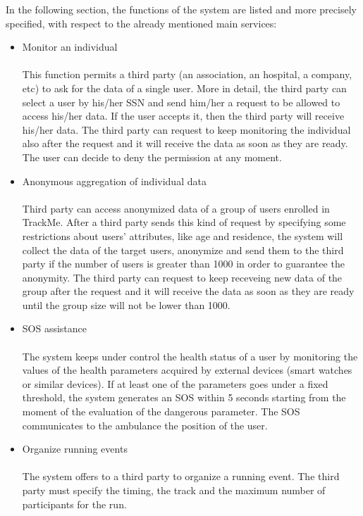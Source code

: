 \documentclass{article}
\begin{document}
\begin{legal}
\begin{legal}
{In the following section, the functions of the system are listed and more precisely specified, with
respect to the already mentioned main services:
		\begin{itemize}
		\item Monitor an individual\\\\
		This function permits a third party (an association, an hospital, a company, etc) to ask for the data of a single user. More in detail, the third party can select a user by his/her SSN and send him/her a request to be allowed to access his/her data. If the user accepts it, then the third party will receive his/her data. The third party can request to keep monitoring the individual also after the request and it will receive the data as soon as they are ready. The user can decide to deny the permission at any moment. \\
		\item Anonymous aggregation of individual data\\\\
		Third party can access anonymized data of a group of users enrolled in TrackMe. After a third party sends this kind of request by specifying some restrictions about users’ attributes, like age and residence, the system will collect the data of the target users, anonymize and send them to the third party if the number of users is greater than 1000 in order to guarantee the anonymity. The third party can request to keep receveing new data of the group after the request and it will receive the data as soon as they are ready until the group size will not be lower than 1000.\\
		\item SOS assistance\\\\
		The system keeps under control the health status of a user by monitoring the values of the health parameters acquired by external devices (smart watches or similar devices). If at least one of the parameters goes under a fixed threshold, the system generates an SOS within 5 seconds starting from the moment of the evaluation of the dangerous parameter. The SOS communicates to the ambulance the position of the user.\\
		\item Organize running events\\\\
		The system offers to a third party to organize a running event. The third party must specify the timing, the track and the maximum number of participants for the run.\\

\end{itemize}}
\end{legal}
\end{legal}
\end{document}

